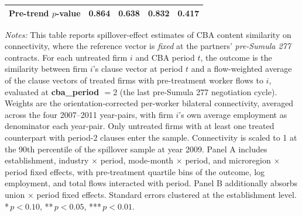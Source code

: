 \begin{table}[H]
\begin{tabular}{lcccc}
Pre-trend $p$-value & 0.864 & 0.638 & 0.832 & 0.417 \\
\hline\hline
\end{tabular}
\begin{minipage}{\linewidth}
\smallskip
\scriptsize\textit{Notes:} This table reports spillover-effect estimates of CBA content similarity on connectivity, where the reference vector is \emph{fixed} at the partners' \textit{pre-Sumula 277} contracts. For each untreated firm $i$ and CBA period $t$, the outcome is the similarity between firm $i$'s clause vector at period $t$ and a flow-weighted average of the clause vectors of treated firms with pre-treatment worker flows to $i$, evaluated at \textbf{cba\_period $= 2$} (the last pre-Sumula 277 negotiation cycle). Weights are the orientation-corrected per-worker bilateral connectivity, averaged across the four 2007--2011 year-pairs, with firm $i$'s own average employment as denominator each year-pair. Only untreated firms with at least one treated counterpart with period-2 clauses enter the sample. Connectivity is scaled to 1 at the 90th percentile of the spillover sample at year 2009. Panel A includes establishment, industry $\times$ period, mode-month $\times$ period, and microregion $\times$ period fixed effects, with pre-treatment quartile bins of the outcome, log employment, and total flows interacted with period. Panel B additionally absorbs union $\times$ period fixed effects. Standard errors clustered at the establishment level. *\,$p<0.10$, **\,$p<0.05$, ***\,$p<0.01$.
\end{minipage}
\end{table}
